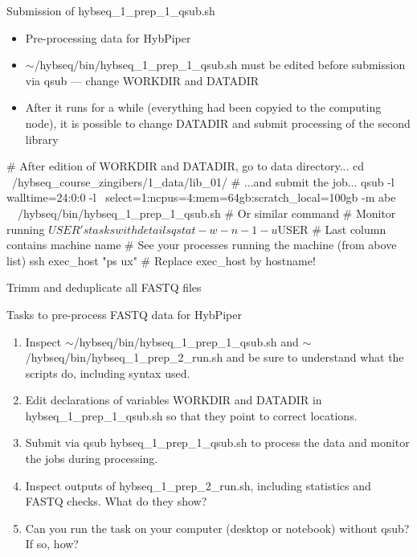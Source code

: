 \documentclass[compress,  xelatex, 11pt, xcolor=x11names, aspectratio=169,
	hyperref={
		bookmarks=true,
		unicode=true,
		colorlinks=true,
		pdftitle={HybSeq course},
		plainpages=false,
		pdfauthor={Vojtech Zeisek},
		pdfsubject={Practical processing of HybSeq target enrichment sequencing data on computing grids like MetaCentrum},
		pdfcreator={XeLaTeX},
		pdfkeywords={BASH, command line, GNU, HybSeq, Linux, MetaCentrum, sequencing shell, target enrichment},
		linkcolor=Turquoise4, %
		anchorcolor=DodgerBlue4, %
		citecolor=DodgerBlue4, %
		filecolor=DodgerBlue4, %
		menucolor=Tan4, %
		urlcolor=DarkOliveGreen4 %
		},
	url={hyphens, lowtilde} %
	]{beamer}
\renewcommand{\texttt}[1]{\colorbox{Cornsilk2}{{\ttfamily #1}}}
\renewcommand{\alert}[1]{\textcolor{OrangeRed3}{#1}}
\begin{document}
\begin{frame}[fragile]{Submission of hybseq\_1\_prep\_1\_qsub.sh}
	\begin{itemize}
		\item Pre-processing data for HybPiper
		\item \alert{\texttt{$\sim$/hybseq/bin/hybseq\_1\_prep\_1\_qsub.sh} must be edited before submission via \texttt{qsub} --- change \texttt{WORKDIR} and \texttt{DATADIR}}
		\item After it runs for a while (everything had been copyied to the computing node), it is possible to change \texttt{DATADIR} and submit processing of the second library
	\end{itemize}
	\begin{bashcode}
    # After edition of WORKDIR and DATADIR, go to data directory...
    cd ~/hybseq_course_zingibers/1_data/lib_01/ # ...and submit the job...
    qsub -l walltime=24:0:0 -l \
      select=1:ncpus=4:mem=64gb:scratch_local=100gb -m abe \
      ~/hybseq/bin/hybseq_1_prep_1_qsub.sh
    # Or similar command
    # Monitor running $USER's tasks with details
    qstat -w -n -1 -u $USER # Last column contains machine name
    # See your processes running the machine (from above list)
    ssh exec_host "ps ux" # Replace exec_host by hostname!
	\end{bashcode}
\end{frame}

\begin{frame}{Trimm and deduplicate all FASTQ files}
	\begin{exampleblock}{Tasks to pre-process FASTQ data for HybPiper}
			\begin{enumerate}
				\item Inspect \texttt{$\sim$/hybseq/bin/hybseq\_1\_prep\_1\_qsub.sh} and \texttt{$\sim$/hybseq/bin/hybseq\_1\_prep\_2\_run.sh} and be sure to understand what the scripts do, including syntax used.
				\item Edit declarations of variables \texttt{WORKDIR} and \texttt{DATADIR} in \texttt{hybseq\_1\_prep\_1\_qsub.sh} so that they point to correct locations.
				\item Submit via \texttt{qsub} \texttt{hybseq\_1\_prep\_1\_qsub.sh} to process the data and monitor the jobs during processing.
				\item Inspect outputs of \texttt{hybseq\_1\_prep\_2\_run.sh}, including statistics and FASTQ checks. What do they show?
				\item Can you run the task on your computer (desktop or notebook) without \texttt{qsub}? If so, how?
		\end{enumerate}
	\end{exampleblock}
\end{frame}
\end{document}
